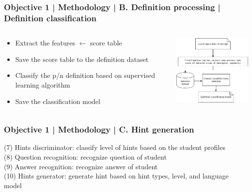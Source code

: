 \documentclass{beamer}
\begin{document}
\begin{frame}
\frametitle{Objective 1 | Methodology | B. Definition processing | Definition classification}
\begin{columns}

	\begin{column}{.55\textwidth}
		\begin{itemize}
			\item Extract the features $\leftarrow$ score table
			\item Save the score table to the definition dataset
			\item Classify the p/n definition based on supervised learning algorithm
			\item Save the classification model
		\end{itemize}
	
	\end{column}
	\begin{column}{.55\textwidth}
	\includegraphics[width=50mm]{dc1.png}
\end{column}
	
	
\end{columns}
\end{frame}
\begin{frame}
\frametitle{Objective 1 | Methodology | C. Hint generation}
(7) Hints discriminator: classify level of hints based on the student profiles \\
(8) Question recognition: recognize question of student\\
(9) Answer recognition: recognize answer of student \\

(10) Hints generator: generate hint based on hint types, level, and language model \\
\end{frame}
\end{document}
